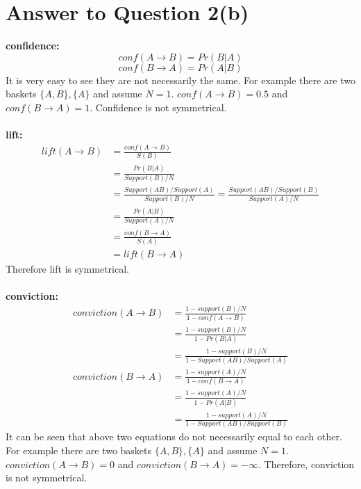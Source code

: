 \documentclass[11pt]{article}
\begin{document}
\section*{Answer to Question 2(b)}
\textbf{confidence: }\\
\begin{equation}
    conf(A\rightarrow B) = Pr(B|A)
\end{equation}
\begin{equation}
    conf(B\rightarrow A) = Pr(A|B)
\end{equation}
It is very easy to see they are not necessarily the same.
For example there are two baskets $\{A, B\}, \{A\}$ and assume $N=1$.
$conf(A\rightarrow B) = 0.5$ and $conf(B\rightarrow A) = 1$.
Confidence is not symmetrical.\\
\\
\textbf{lift: }
\begin{equation}
\begin{aligned}
    lift(A\rightarrow B) & = \frac{conf(A\rightarrow B)}{S(B)}\\
    & = \frac{Pr(B|A)}{Support(B)/N}\\
    & = \frac{Support(AB)/Support(A)}{Support(B)/N} = \frac{Support(AB)/Support(B)}{Support(A)/N}\\
    & = \frac{Pr(A|B)}{Support(A)/N}\\
    & = \frac{conf(B\rightarrow A)}{S(A)}\\
    & = lift(B\rightarrow A)
\end{aligned}
\end{equation}
Therefore lift is symmetrical.\\
\\
\textbf{conviction: }
\begin{equation}
\begin{aligned}
    conviction(A\rightarrow B) & = \frac{1 - support(B)/N}{1 - conf(A\rightarrow B)}\\
    & = \frac{1 - support(B)/N}{1 - Pr(B|A)}\\
    & = \frac{1 - support(B)/N}{1 - Support(AB)/Support(A)}
\end{aligned}
\end{equation}
\begin{equation}
\begin{aligned}
    conviction(B\rightarrow A) & = \frac{1 - support(A)/N}{1 - conf(B\rightarrow A)}\\
    & = \frac{1 - support(A)/N}{1 - Pr(A|B)}\\
    & = \frac{1 - support(A)/N}{1 - Support(AB)/Support(B)}
\end{aligned}
\end{equation}
It can be seen that above two equations do not necessarily equal to each other.
For example there are two baskets $\{A, B\}, \{A\}$ and assume $N=1$.
$conviction(A\rightarrow B) = 0$ and $conviction(B\rightarrow A) = -\infty$.
Therefore, conviction is not symmetrical.
\end{document}
